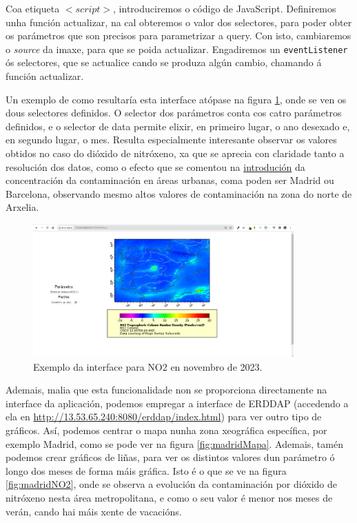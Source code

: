 Coa etiqueta $<script>$, introduciremos o código de JavaScript. Definiremos unha función actualizar, na cal obteremos o valor dos selectores, para poder obter os parámetros que son precisos para
parametrizar a query. Con isto, cambiaremos o \textit{source} da imaxe, para que se poida actualizar. Engadiremos un \texttt{eventListener} ós selectores, que se actualice cando se produza algún
cambio, chamando á función actualizar.

Un exemplo de como resultaría esta interface atópase na figura \ref{fig:interfazfoto}, onde se ven os dous selectores definidos. O selector dos parámetros conta cos catro parámetros definidos, e o
selector de data permite elixir, en primeiro lugar, o ano desexado e, en segundo lugar, o mes. Resulta especialmente interesante observar os valores obtidos no caso do dióxido de nitróxeno, xa que
se aprecia con claridade tanto a resolución dos datos, como o efecto que se comentou na \hyperref[introducion]{introdución} da concentración da contaminación en áreas urbanas, coma poden ser Madrid
ou Barcelona, observando mesmo altos valores de contaminación na zona do norte de Arxelia.
\begin{figure}
    \centerline{\includegraphics[width=10cm]{figuras/interfaz.png}}
    \caption{Exemplo da interface para NO2 en novembro de 2023.}
    \label{fig:interfazfoto}
\end{figure}

Ademais, malia que esta funcionalidade non se proporciona directamente na interface da aplicación, podemos empregar a interface de ERDDAP (accedendo a ela en \url{http://13.53.65.240:8080/erddap/index.html})
para ver outro tipo de gráficos. Así, podemos centrar o mapa nunha zona xeográfica específica, por exemplo Madrid, como se pode ver na figura \ref{fig:madridMapa}. Ademais, tamén podemos crear gráficos
de liñas, para ver os distintos valores dun parámetro ó longo dos meses de forma máis gráfica. Isto é o que se ve na figura \ref{fig:madridNO2}, onde se observa a evolución da contaminación por dióxido
de nitróxeno nesta área metropolitana, e como o seu valor é menor nos meses de verán, cando hai máis xente de vacacións.


